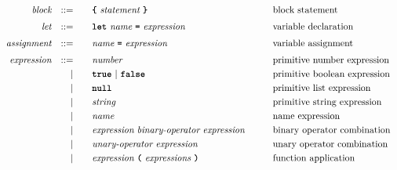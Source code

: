 \begin{alignat*}{9}
&& \textit{block}        && ::= &      && \textbf{\texttt{\{}}\  \textit{statement}   \ \textbf{\texttt{\}}} \quad
                                                           && \textrm{block statement}\\[1mm]         
&& \textit{let}          && ::= &\quad &&  \textbf{\texttt{let}}\  \textit{name} \ 
                                           \textbf{\texttt{=}}\  \textit{expression} 
                                                            && \textrm{variable declaration}   \\[1mm]
&& \textit{assignment}   && ::= &\quad &&  \textit{name} \ 
                                           \textbf{\texttt{=}}\  \textit{expression} 
                                                            && \textrm{variable assignment}   \\[1mm]
&& \textit{expression}   && ::= &\quad &&  \textit{number}   && \textrm{primitive number expression}\\
&&                       && |   &\quad && \textbf{\texttt{true}}\ |\ \textbf{\texttt{false}}
                                                           && \textrm{primitive boolean expression}\\
&&                       && |   &\quad && \textbf{\texttt{null}}
                                                           && \textrm{primitive list expression}\\
&&                       && |   &\quad &&  \textit{string}   && \textrm{primitive string expression}\\
&&                       && |   &\quad &&  \textit{name}   && \textrm{name expression}\\
&&                       && |   &\quad &&  \textit{expression} \  \textit{binary-operator} \ 
                                            \textit{expression} \qquad
                                                           && \textrm{binary operator combination}\\
&&                       && |   &\quad &&   \textit{unary-operator} \ 
                                            \textit{expression}
                                                           && \textrm{unary operator combination}\\
&&                       && |   &\quad &&   \textit{expression} \ 
                                            \textbf{\texttt{(}}\ \textit{expressions}\
                                            \textbf{\texttt{)}}
                                                           && \textrm{function application}\\

\end{alignat*}

